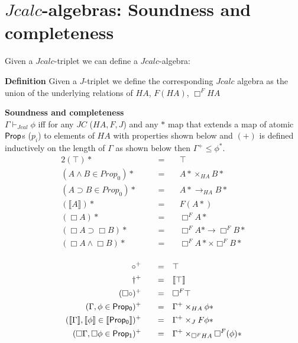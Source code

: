 \section{ $Jcalc$-algebras: Soundness and completeness}
Given a $Jcalc$-triplet we can define a $Jcalc$-algebra:
\begin{mdframed}
    \textbf{Definition}
    Given a $J$-triplet we define the corresponding $Jcalc$
     algebra as the union of the underlying relations
    of   $HA$, $F(HA)$, $\Box^{F}HA$
\end{mdframed}
    \begin{theorem}\label{thm:cmpjtriplet}
        \textbf{Soundness and completeness}\\
    $\Gamma\vdash_{Jcal}\phi$ iff for any   $JC$ ($HA,F,J$)
    and any $*$ map that extends  a map of atomic $\prop$s ($p_i$) to elements of $HA$ 
    with properties shown below and $(+)$ 
    is defined inductively on the length of $\Gamma$ as shown below
    then $\Gamma^+\leq\phi^{*}$.
    \begin{alignat*}{2}
        (\top)* &&\quad= & \quad\top\\
        (A\wedge B \in Prop_0)*  &&\quad = & \quad  A*\times_{HA}B*\\
        (A\supset B \in Prop_0)*  &&\quad = & \quad A*\rightarrow_{HA} B*\\
        (\llbracket A\rrbracket)* && \quad = & \quad F(A*)\\					
        (\Box A)* &&\quad = & \quad\Box^F A* \\
        (\Box A\supset \Box B)*  &&\quad = & \quad\Box^F A* \rightarrow{\Box^F B*}\\
        (\Box A\wedge\Box B)*  &&\quad = & \quad\Box^F A*\times{\Box^F B*}\\
    \end{alignat*}
    
    \begin{alignat*}{2}
      \circ^+  &&\quad = & \quad\top\\
      \dagger^+ &&\quad = & \quad\llbracket\top\rrbracket\\
      (\Box\circ)^+ &&\quad = & \quad\Box^F \top\\
      (\Gamma,\phi\in \sf {Prop_0})^+&&\quad = &\quad
      \Gamma^+\times_{HA}\phi* \\
      (\llbracket \Gamma\rrbracket,\llbracket\phi\rrbracket \in {\sf \llbracket Prop_0\rrbracket})^+&&\quad = &\quad
      \Gamma^+\times_{J}F\phi*\\
      (\Box\Gamma, \Box\phi \in {\sf Prop_1})^+&&\quad = &\quad
      \Gamma^+\times_{\Box^{F}HA}\Box^F (\phi)*\\
    \end{alignat*}
    \end{theorem}
